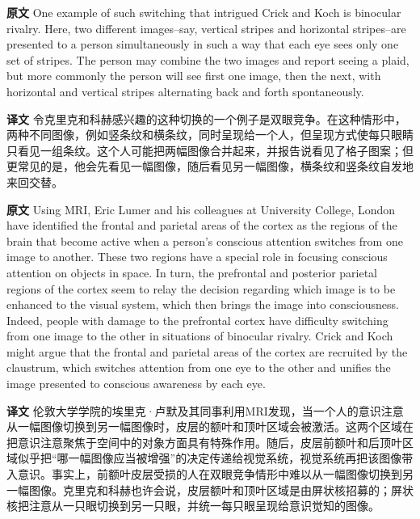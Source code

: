 \documentclass[UTF8]{ctexart}
\newenvironment{english}{\par\small\noindent\textbf{原文}\quad\ignorespaces}{\par}
\newenvironment{zhtranslation}{\par\noindent\textbf{译文}\quad\ignorespaces}{\par\vspace{0.35em}}
\begin{document}
\begin{english}
One example of such switching that intrigued Crick and Koch is binocular rivalry. Here, two different images--say, vertical stripes and horizontal stripes--are presented to a person simultaneously in such a way that each eye sees only one set of stripes. The person may combine the two images and report seeing a plaid, but more commonly the person will see first one image, then the next, with horizontal and vertical stripes alternating back and forth spontaneously.
\end{english}
\begin{zhtranslation}
令克里克和科赫感兴趣的这种切换的一个例子是双眼竞争。在这种情形中，两种不同图像，例如竖条纹和横条纹，同时呈现给一个人，但呈现方式使每只眼睛只看见一组条纹。这个人可能把两幅图像合并起来，并报告说看见了格子图案；但更常见的是，他会先看见一幅图像，随后看见另一幅图像，横条纹和竖条纹自发地来回交替。\end{zhtranslation}

\begin{english}
Using MRI, Eric Lumer and his colleagues at University College, London have identified the frontal and parietal areas of the cortex as the regions of the brain that become active when a person's conscious attention switches from one image to another. These two regions have a special role in focusing conscious attention on objects in space. In turn, the prefrontal and posterior parietal regions of the cortex seem to relay the decision regarding which image is to be enhanced to the visual system, which then brings the image into consciousness. Indeed, people with damage to the prefrontal cortex have difficulty switching from one image to the other in situations of binocular rivalry. Crick and Koch might argue that the frontal and parietal areas of the cortex are recruited by the claustrum, which switches attention from one eye to the other and unifies the image presented to conscious awareness by each eye.
\end{english}
\begin{zhtranslation}
伦敦大学学院的埃里克·卢默及其同事利用MRI发现，当一个人的意识注意从一幅图像切换到另一幅图像时，皮层的额叶和顶叶区域会被激活。这两个区域在把意识注意聚焦于空间中的对象方面具有特殊作用。随后，皮层前额叶和后顶叶区域似乎把“哪一幅图像应当被增强”的决定传递给视觉系统，视觉系统再把该图像带入意识。事实上，前额叶皮层受损的人在双眼竞争情形中难以从一幅图像切换到另一幅图像。克里克和科赫也许会说，皮层额叶和顶叶区域是由屏状核招募的；屏状核把注意从一只眼切换到另一只眼，并统一每只眼呈现给意识觉知的图像。\end{zhtranslation}
\end{document}
